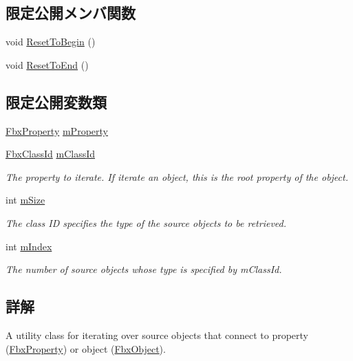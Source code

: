 \subsection*{限定公開メンバ関数}
\begin{DoxyCompactItemize}
\item 
void \hyperlink{class_fbx_iterator_src_base_af425474061cfa1a1ae0714dfedd6ddbb}{Reset\+To\+Begin} ()
\item 
void \hyperlink{class_fbx_iterator_src_base_a9d56b32e28d26a8eb96cfa0ebbf8ed06}{Reset\+To\+End} ()
\end{DoxyCompactItemize}
\subsection*{限定公開変数類}
\begin{DoxyCompactItemize}
\item 
\hyperlink{class_fbx_property}{Fbx\+Property} \hyperlink{class_fbx_iterator_src_base_aa07b855d779bd7b3383ef7a41dbab232}{m\+Property}
\item 
\hyperlink{class_fbx_class_id}{Fbx\+Class\+Id} \hyperlink{class_fbx_iterator_src_base_a3afdc4502fd7d4c2424ad3e99bd8e7a4}{m\+Class\+Id}
\begin{DoxyCompactList}\small\item\em The property to iterate. If iterate an object, this is the root property of the object. \end{DoxyCompactList}\item 
int \hyperlink{class_fbx_iterator_src_base_a267938478933f2405b32bf9722648d36}{m\+Size}
\begin{DoxyCompactList}\small\item\em The class ID specifies the type of the source objects to be retrieved. \end{DoxyCompactList}\item 
int \hyperlink{class_fbx_iterator_src_base_adfb8404f7244dfdbe9e40cfc4d9e53b6}{m\+Index}
\begin{DoxyCompactList}\small\item\em The number of source objects whose type is specified by m\+Class\+Id. \end{DoxyCompactList}\end{DoxyCompactItemize}


\subsection{詳解}
A utility class for iterating over source objects that connect to property (\hyperlink{class_fbx_property}{Fbx\+Property}) or object (\hyperlink{class_fbx_object}{Fbx\+Object}). 

